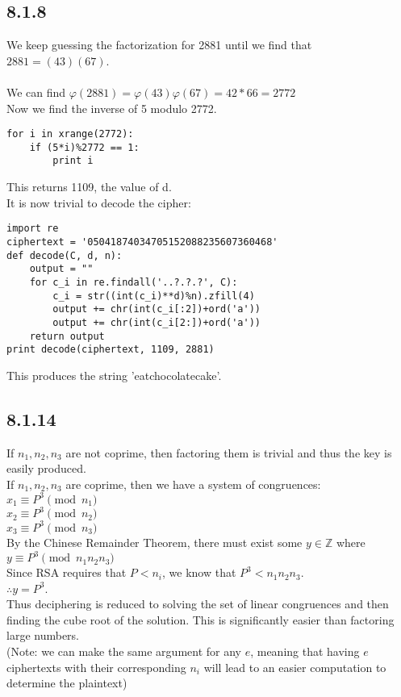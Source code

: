 \documentclass{article}
\begin{document}
\subsection{8.1.8}
We keep guessing the factorization for 2881 until we find that $2881=(43)(67)$.
\\
\\We can find $\varphi(2881) = \varphi(43)\varphi(67) = 42*66 = 2772$
\\Now we find the inverse of 5 modulo 2772.
\begin{lstlisting}
for i in xrange(2772):
    if (5*i)%2772 == 1:
        print i
\end{lstlisting}
This returns 1109, the value of d.
\\It is now trivial to decode the cipher:
\begin{lstlisting}
import re
ciphertext = '05041874034705152088235607360468'
def decode(C, d, n): 
    output = ""
    for c_i in re.findall('..?.?.?', C): 
        c_i = str((int(c_i)**d)%n).zfill(4)
        output += chr(int(c_i[:2])+ord('a'))
        output += chr(int(c_i[2:])+ord('a'))
    return output
print decode(ciphertext, 1109, 2881)
\end{lstlisting}
This produces the string 'eatchocolatecake'.

\newpage
\subsection{8.1.14}
If $n_1, n_2, n_3$ are not coprime, then factoring them is trivial and thus the key is easily produced.
\\If $n_1, n_2, n_3$ are coprime, then we have a system of congruences:
\\$x_1 \equiv P^3 \pmod{n_1}$
\\$x_2 \equiv P^3 \pmod{n_2}$
\\$x_3 \equiv P^3 \pmod{n_3}$
\\By the Chinese Remainder Theorem, there must exist some $y \in \mathbb{Z}$
where $y \equiv P^3 \pmod{n_1n_2n_3}$
\\Since RSA requires that $P < n_i$, we know that $P^3 < n_1n_2n_3$.
\\$\therefore y = P^3$.
\\Thus deciphering is reduced to solving the set of linear congruences and then finding the cube root of the solution. This is significantly easier than factoring large numbers.
\\(Note: we can make the same argument for any $e$, meaning that having $e$ ciphertexts with their corresponding $n_i$ will lead to an easier computation to determine the plaintext)
\end{document}
